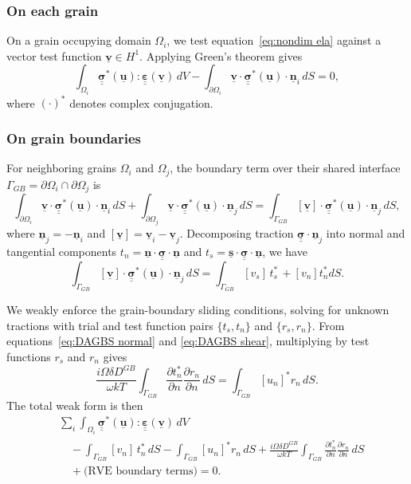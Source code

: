 \documentclass[12pt]{article}
\newcommand{\tensor}[1]{\underline{\underline{\boldsymbol{#1}}}}
\newcommand{\vect}[1]{\underline{\boldsymbol{#1}}}
\begin{document}
\subsubsection{On each grain}
On a grain occupying domain $\Omega_i$, we test equation~\ref{eq:nondim ela} against a vector test function $\vect{v} \in H^1$. Applying Green’s theorem gives
\begin{equation}
    \int_{\Omega_i} \tensor{\sigma}^*(\vect{u}) : \tensor{\varepsilon}(\vect{v})\, dV
    - \int_{\partial\Omega_i} \vect{v}\cdot\tensor{\sigma}^*(\vect{u})\cdot\vect{n}_i\, dS = 0, \label{eq: ingrain weak}
\end{equation}
where $(\cdot)^*$ denotes complex conjugation.

\subsubsection{On grain boundaries} \label{gb}
For neighboring grains $\Omega_i$ and $\Omega_j$, the boundary term over their shared interface $\Gamma_{GB} = \partial\Omega_i \cap \partial\Omega_j$ is
\begin{equation}
    \int_{\partial\Omega_i} \vect{v}\cdot\tensor{\sigma}^*(\vect{u})\cdot\vect{n}_i\, dS 
    + \int_{\partial\Omega_j} \vect{v}\cdot\tensor{\sigma}^*(\vect{u})\cdot\vect{n}_j\, dS
    = \int_{\Gamma_{GB}} [\vect{v}]\cdot\tensor{\sigma}^*(\vect{u})\cdot\vect{n}_j\, dS,
\end{equation}
where $\vect{n}_j = -\vect{n}_i$ and $[\vect{v}] = \vect{v}_i - \vect{v}_j$.
Decomposing traction $\tensor{\sigma}\cdot\vect{n}_j$ into normal and tangential components $t_n = \vect{n}\cdot\tensor{\sigma}\cdot\vect{n}$ and $t_s = \vect{s}\cdot\tensor{\sigma}\cdot\vect{n}$, we have
\begin{equation}
    \int_{\Gamma_{GB}} [\vect{v}]\cdot\tensor{\sigma}^*(\vect{u})\cdot\vect{n}_j\, dS = \int_{\Gamma_{GB}} [v_s]\, t_s^*\, +[v_n]t_n^*dS.
\end{equation}

We weakly enforce the grain-boundary sliding conditions, solving for unknown tractions with trial and test function pairs $\{t_s, t_n\}$ and $\{r_s, r_n\}$. From equations~\ref{eq:DAGBS normal} and \ref{eq:DAGBS shear}, multiplying by test functions $r_s$ and $r_n$ gives
\begin{equation}
    \frac{i\Omega\delta D^{GB}}{\omega kT}\int_{\Gamma_{GB}}\frac{\partial t_n^*}{\partial n}\frac{\partial r_n}{\partial n} \, dS= \int_{\Gamma_{GB}} [u_n]^* r_n\, dS.
\end{equation}
The total weak form is then
\begin{equation}
\begin{aligned}
&\sum_i \int_{\Omega_i} \tensor{\sigma}^*(\vect{u}) : \tensor{\varepsilon}(\vect{v})\, dV \\
&\quad  - \int_{\Gamma_{GB}} [v_n]\, t_n^*\, dS 
-\int_{\Gamma_{GB}} [u_n]^* r_n\, dS +\frac{i\Omega\delta D^{GB}}{\omega kT}\int_{\Gamma_{GB}}\frac{\partial t_n^*}{\partial n}\frac{\partial r_n}{\partial n} \, dS\\
&\quad + \text{(RVE boundary terms)} = 0.
\end{aligned}
\end{equation}
\end{document}
